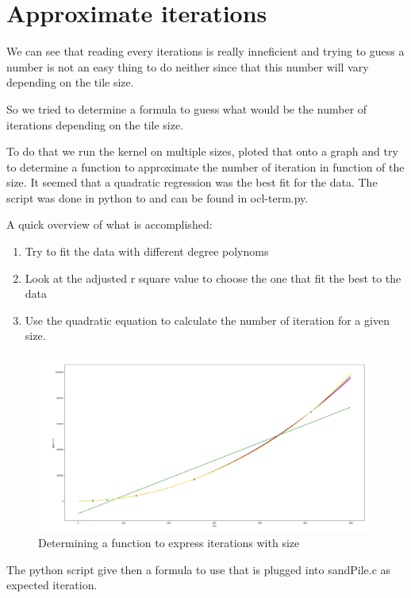 \documentclass{report}
\begin{document}
\section{Approximate iterations}
We can see that reading every iterations is really inneficient and trying to guess a number
is not an easy thing to do neither since that this number will vary depending on the tile size.

So we tried to determine a formula to guess what would be the number of iterations depending on the tile
size.

To do that we run the kernel on multiple sizes, ploted that onto a graph and try to determine
a function to approximate the number of iteration in function of the size.
It seemed that a quadratic regression was the best fit for the data.
The script was done in python to and can be found in ocl-term.py.

A quick overview of what is accomplished:
\begin{enumerate}
	\item Try to fit the data with different degree polynoms
	\item Look at the adjusted r square value to choose the one that fit the best to the data
	\item Use the quadratic equation to calculate the number of iteration for a given size.
\end{enumerate}
\begin{center}
	\begin{figure}[H]
		\includegraphics[width=17cm]{img/ocl_iter.png}
		\centering
		\caption{Determining a function to express iterations with size}
	\end{figure}
\end{center}

The python script give then a formula to use that is plugged into sandPile.c
as expected iteration.
\end{document}
